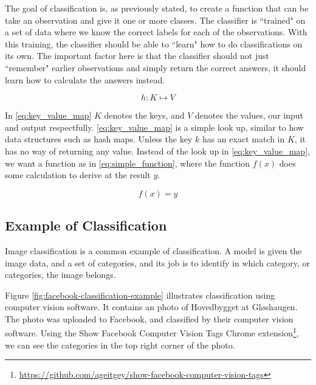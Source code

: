 The goal of classification is, as previously stated, to create a function that can be take an observation and give it one or more classes. The classifier is ``trained" on a set of data where we know the correct labels for each of the observations. With this training, the classifier should be able to ``learn" how to do classifications on its own. The important factor here is that the classifier should not just ``remember" earlier observations and simply return the correct answers, it should learn how to calculate the answers instead. 

\begin{equation}
    \label{eq:key_value_map}
    h: K \mapsto V
\end{equation}

In \ref{eq:key_value_map} $K$ denotes the keys, and $V$ denotes the values, our input and output respectfully. \ref{eq:key_value_map} is a simple look up, similar to how data structures such as hash maps. Unless the key $k$ has an exact match in $K$, it has no way of returning any value. Instead of the look up in \ref{eq:key_value_map}, we want a function as in \ref{eq:simple_function}, where the function $f(x)$ does some calculation to derive at the result $y$.

\begin{equation}
    \label{eq:simple_function}
    f(x) = y
\end{equation}

\subsection{Example of Classification}
Image classification is a common example of classification. A model is given the image data, and a set of categories, and its job is to identify in which category, or categories, the image belongs.

Figure \ref{fig:facebook-classification-example} illustrates classification using computer vision software. It contains an photo of Hovedbygget at Gløshaugen. The photo was uploaded to Facebook, and classified by their computer vision software. Using the Show Facebook Computer Vision Tags Chrome extension\footnote{\url{https://github.com/ageitgey/show-facebook-computer-vision-tags}}, we can see the categories in the top right corner of the photo.

